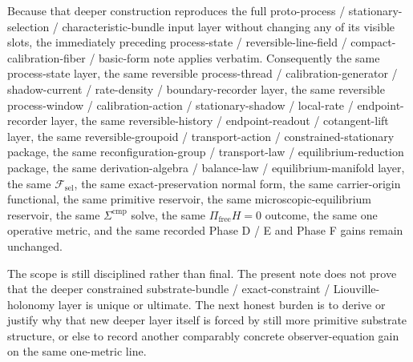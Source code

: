\documentclass[11pt]{article}
\newcommand{\StemFunctional}{\mathscr F_{\mathrm{sel}}}
\begin{document}
Because that deeper construction reproduces the full proto-process / stationary-selection / characteristic-bundle input layer without changing any of its visible slots, the immediately preceding process-state / reversible-line-field / compact-calibration-fiber / basic-form note applies verbatim. Consequently the same process-state layer, the same reversible process-thread / calibration-generator / shadow-current / rate-density / boundary-recorder layer, the same reversible process-window / calibration-action / stationary-shadow / local-rate / endpoint-recorder layer, the same reversible-history / endpoint-readout / cotangent-lift layer, the same reversible-groupoid / transport-action / constrained-stationary package, the same reconfiguration-group / transport-law / equilibrium-reduction package, the same derivation-algebra / balance-law / equilibrium-manifold layer, the same \(\StemFunctional\), the same exact-preservation normal form, the same carrier-origin functional, the same primitive reservoir, the same microscopic-equilibrium reservoir, the same \(\Sigma^{\mathrm{cmp}}\) solve, the same \(\Pi_{\mathrm{free}}H=0\) outcome, the same one operative metric, and the same recorded Phase D / E and Phase F gains remain unchanged.

The scope is still disciplined rather than final. The present note does not prove that the deeper constrained substrate-bundle / exact-constraint / Liouville-holonomy layer is unique or ultimate. The next honest burden is to derive or justify why that new deeper layer itself is forced by still more primitive substrate structure, or else to record another comparably concrete observer-equation gain on the same one-metric line.
\end{document}
